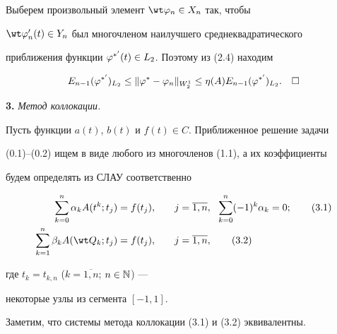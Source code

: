 Выберем произвольный элемент $\wt\vp_n\in X_n$ так, чтобы 


$\wt\vp{}'_n(t)\in Y_n$ был многочленом наилучшего среднеквадратического


приближения функции $\varphi^{*'}(t)\in L_2$. Поэтому из (2.4) находим


$$


E_{n-1}(\vp^{*'})_{L_2}\le\|\vp^*-\vp_n\|_{W^1_2}\le\eta(A)E_{n-1}(


\vp^{*'})_{L_2}.\quad\square


$$








{\bf 3.} {\it Метод коллокации.}


Пусть функции $a(t)$, $b(t)$ и $f(t)\in C$. Приближенное решение задачи


(0.1)--(0.2) ищем в виде любого из многочленов (1.1), а их коэффициенты


будем определять из СЛАУ соответственно


\begin{alignat}{2}


\sum_{k=0}^{n}\alpha_kA(t^k;t_j)&=f(t_j),&\quad j&=\overline{1,n},


\ \ \sum^n_{k=0}(-1)^k\alpha_k=0;\tag{3.1} \\


%


\sum_{k=1}^{n}\beta_kA(\wt Q_k;t_j)&=f(t_j),&\quad j&=\overline{1,n},


\tag{3.2}


\end{alignat}


где $t_k=t_{k,n}$ ($k=\overline{1,n}$; $n\in\Bbb N$) ---


некоторые узлы из сегмента $[-1,1]$. 





Заметим, что системы метода коллокации (3.1) и (3.2) эквивалентны. 








